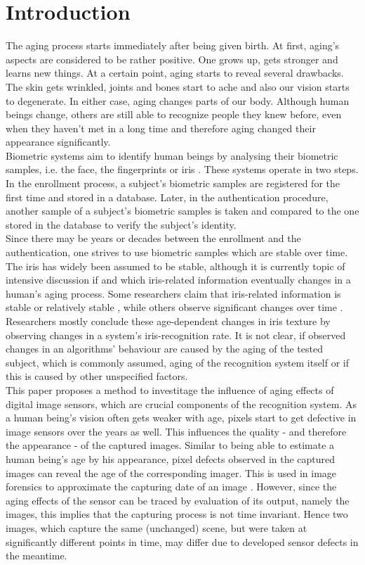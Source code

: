 \documentclass[10pt,twocolumn,letterpaper]{article}
\begin{document}
\section{Introduction}
The aging process starts immediately after being given birth. At first, aging's aspects are considered to be rather positive. One grows up, gets stronger and learns new things. At a certain point, aging starts to reveal several drawbacks. The skin gets wrinkled, joints and bones start to ache and also our vision starts to degenerate. In either case, aging changes parts of our body. Although human beings change, others are still able to recognize people they knew before, even when they haven't met in a long time and therefore aging changed their appearance significantly. \\
Biometric systems aim to identify human beings by analysing their biometric samples, i.e. the face, the fingerprints or iris \cite{rathgeb}. These systems operate in two steps. In the enrollment process, a subject's biometric samples are registered for the first time and stored in a database. Later, in the authentication procedure, another sample of a subject's biometric samples is taken and compared to the one stored in the database to verify the subject's identity. \\
Since there may be years or decades between the enrollment and the authentication, one strives to use biometric samples which are stable over time. The iris has widely been assumed to be stable, although it is currently topic of intensive discussion if and which iris-related information eventually changes in a human's aging process. Some researchers claim that iris-related information is stable or relatively stable \cite{daugmanPatent, daugmanNoChange, grotherStability, monroDCTIris}, while others observe significant changes over time \cite{rankinChange, rankinChangeResponse, fenkerIrisAging, czajkaTemplateAging, fairhurstNonstability}. Researchers mostly conclude these age-dependent changes in iris texture by observing changes in a system's iris-recognition rate. It is not clear, if observed changes in an algorithms' behaviour are caused by the aging of the tested subject, which is commonly assumed, aging of the recognition system itself or if this is caused by other unspecified factors.\\
This paper proposes a method to investitage the influence of aging effects of digital image sensors, which are crucial components of the recognition system. As a human being's vision often gets weaker with age, pixels start to get defective in image sensors over the years as well. This influences the quality - and therefore the appearance - of the captured images. Similar to being able to estimate a human being's age by his appearance, pixel defects observed in the captured images can reveal the age of the corresponding imager. This is used in image forensics to approximate the capturing date of an image \cite{fridrich}. However, since the aging effects of the sensor can be traced by evaluation of its output, namely the images, this implies that the capturing process is not time invariant. Hence two images, which capture the same (unchanged) scene, but were taken at significantly different points in time, may differ due to developed sensor defects in the meantime.
\end{document}
